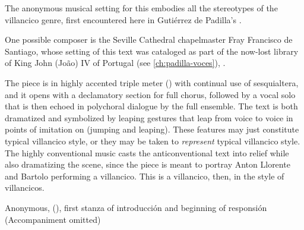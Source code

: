 The anonymous musical setting for this embodies all the stereotypes of the
villancico genre, first encountered here in Gutiérrez de Padilla's .%
\begin{Footnote}
    One possible composer is the Seville Cathedral chapelmaster Fray Francisco
    de Santiago, whose setting of this text was cataloged as part of the
    now-lost library of King John (João) IV of Portugal (see
    \cref{ch:padilla-voces}), 
    \autocite[caixão 26, ]{JohnIV:Catalog}.
\end{Footnote}
The piece is in highly accented triple meter (\meterCZ) with continual use of
sesquialtera, and it opens with a declamatory section for full chorus, followed
by a vocal solo that is then echoed in polychoral dialogue by the full
ensemble.
The text is both dramatized and symbolized by leaping gestures that leap from
voice to voice in points of imitation on  (jumping
and leaping).
These features may just constitute typical villancico style, or they may be
taken to \emph{represent} typical villancico style.
The highly conventional music casts the anticonventional text into relief while
also dramatizing the scene, since the piece is meant to portray Anton Llorente
and Bartolo performing a villancico.
This is a villancico, then, in the style of villancicos.



{Anonymous,  (), first
stanza of introducción and beginning of responsión (Accompaniment omitted)}

